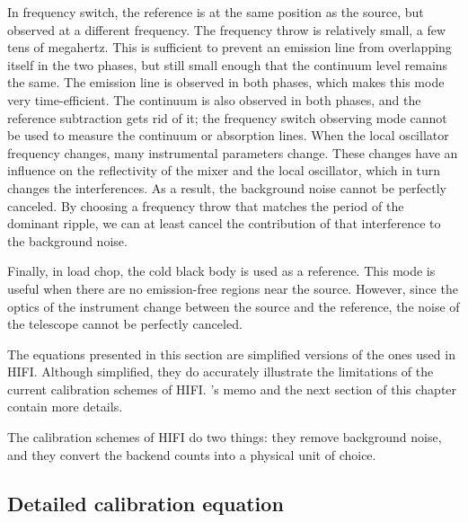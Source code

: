 \label{par:frequency_switch}In frequency switch, the reference is at the same position as the source, but observed at a different frequency.
The frequency throw is relatively small, a few tens of megahertz.
This is sufficient to prevent an emission line from overlapping itself in the two phases, but still small enough that the continuum level remains the same.
The emission line is observed in both phases, which makes this mode very time-efficient.
The continuum is also observed in both phases, and the reference subtraction gets rid of it; the frequency switch observing mode cannot be used to measure the continuum or absorption lines.
When the local oscillator frequency changes, many instrumental parameters change.
These changes have an influence on the reflectivity of the mixer and the local oscillator, which in turn changes the interferences.
As a result, the background noise cannot be perfectly canceled.
By choosing a frequency throw that matches the period of the dominant ripple, we can at least cancel the contribution of that interference to the background noise.

\label{par:load_chop}Finally, in load chop, the cold black body is used as a reference.
This mode is useful when there are no emission-free regions near the source.
However, since the optics of the instrument change between the source and the reference, the noise of the telescope cannot be perfectly canceled.

The equations presented in this section are simplified versions of the ones used in HIFI.
Although simplified, they do accurately illustrate the limitations of the current calibration schemes of HIFI.
\citeauthor{ossenkopf2002intensity}'s memo \cite{ossenkopf2002intensity} and the next section of this chapter contain more details.

The calibration schemes of HIFI do two things: they remove background noise, and they convert the backend counts into a physical unit of choice.



\subsection{Detailed calibration equation}
\label{sec:detailed_hifi_calibration}

